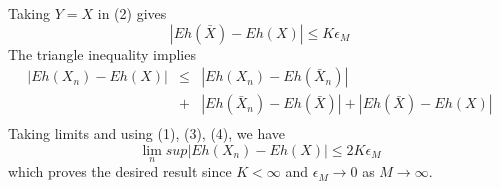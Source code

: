 \documentclass[a4paper, 11pt]{article}
\begin{document}
Taking $Y=X$ in (2) gives 
\begin{equation}
|Eh(\bar{X})-Eh(X)|\le K\epsilon_{M}
\end{equation}
The triangle inequality implies 
\begin{eqnarray*}
|Eh(X_n)-Eh(X)| & \le & |Eh(X_n)-Eh(\bar{X}_{n})| \\
& + & |Eh(\bar{X}_{n})-Eh(\bar{X})| + |Eh(\bar{X})-Eh(X)| \\
\end{eqnarray*}
Taking limits and using (1), (3), (4), we have 
\begin{equation*}
\lim_{n}sup|Eh(X_n)-Eh(X)|\le 2K\epsilon_{M}
\end{equation*}
which proves the desired result since $K<\infty$ and $\epsilon_{M} \rightarrow 0$ as $M\rightarrow \infty.$
\end{document}
